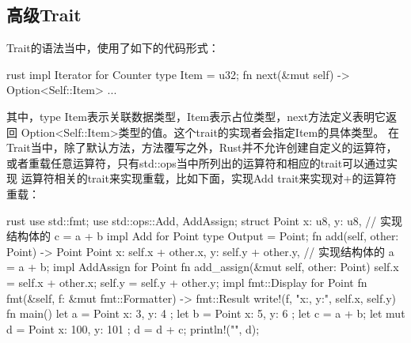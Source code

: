 \subsection{高级Trait}
Trait的语法当中，使用了如下的代码形式：
\begin{code-block}{rust}
impl Iterator for Counter {
    type Item = u32;
    fn next(&mut self) -> Option<Self::Item> {
        ...
    }
}
\end{code-block}
其中，type Item表示关联数据类型，Item表示占位类型，next方法定义表明它返回
Option<Self::Item>类型的值。这个trait的实现者会指定Item的具体类型。
在Trait当中，除了默认方法，方法覆写之外，Rust并不允许创建自定义的运算符，
或者重载任意运算符，只有std::ops当中所列出的运算符和相应的trait可以通过实现
运算符相关的trait来实现重载，比如下面，实现Add trait来实现对+的运算符重载：
\begin{code-block}{rust}
use std::fmt;
use std::ops::{Add, AddAssign};
struct Point {
    x: u8,
    y: u8,
}
// 实现结构体的 c = a + b
impl Add for Point {
    type Output = Point;
    fn add(self, other: Point) -> Point {
        Point {
            x: self.x + other.x,
            y: self.y + other.y,
        }
    }
}
// 实现结构体的 a = a + b;
impl AddAssign for Point {
    fn add_assign(&mut self, other: Point) {
        self.x = self.x + other.x;
        self.y = self.y + other.y;
    }
}
impl fmt::Display for Point {
    fn fmt(&self, f: &mut fmt::Formatter) -> fmt::Result {
        write!(f, "x:{}, y:{}", self.x, self.y)
    }
}
fn main() {
    let a = Point { x: 3, y: 4 };
    let b = Point { x: 5, y: 6 };
    let c = a + b;
    let mut d = Point { x: 100, y: 101 };
    d = d + c;
    println!("{}", d);
}
\end{code-block}

